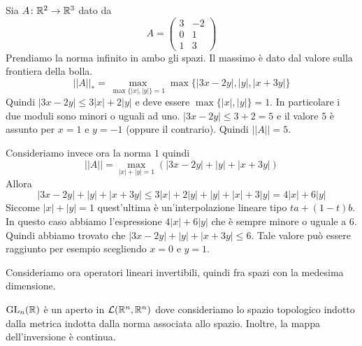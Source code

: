 \documentclass[a4paper]{article}
\begin{document}
\begin{snippetexercise}{}
    Sia \(A \colon \mathbb{R}^2 \to \mathbb{R}^3\)
    dato da
    \[
        A = \begin{pmatrix}
            3 & -2 \\ 0 & 1 \\ 1 & 3
        \end{pmatrix}
    \]
    Prendiamo la norma infinito in ambo gli spazi.
    Il massimo è dato dal valore sulla frontiera della bolla.
    \[
        ||A||_*
        = \max_{\max \{|x|, |y|\} = 1}
        \max \{|3x-2y|, |y|, |x+3y|\}
    \]
    Quindi \(|3x - 2y| \leq 3|x| + 2|y|\)
    e deve essere \(\max\{|x|,|y|\} = 1\).
    In particolare i due moduli sono minori o uguali ad uno.
    \(|3x-2y| \leq 3+2 = 5\) e il valore \(5\)
    è assunto per \(x=1\) e \(y=-1\) (oppure il contrario).
    Quindi \(||A||=5\).

    Consideriamo invece ora la norma \(1\)
    quindi
    \[
        ||A|| = \max_{|x| + |y| = 1}
        (|3x-2y| + |y| + |x+3y|)
    \]
    Allora
    \[
        |3x - 2y| + |y| + |x + 3y|
        \leq 3|x| + 2|y| + |y| + |x| + 3|y|
        = 4|x| + 6|y|
    \]
    Siccome \(|x| + |y| = 1\)
    quest'ultima è un'interpolazione lineare
    tipo \(ta + (1-t)b\).
    In questo caso abbiamo l'espressione 
    \(4|x| + 6|y|\)
    che è sempre minore o uguale a \(6\).
    Quindi abbiamo trovato che \(|3x-2y| + |y| + |x + 3y| \leq 6\).
    Tale valore può essere raggiunto per esempio scegliendo \(x=0\) e \(y=1\).
\end{snippetexercise}

Consideriamo ora operatori lineari invertibili,
quindi fra spazi con la medesima dimensione.

\begin{snippettheorem}{}
    \(\text{GL}_n(\mathbb{R})\) è un aperto 
    in \(\mathcal{L}(\mathbb{R}^n, \mathbb{R}^n)\)
    dove consideriamo lo spazio topologico indotto dalla metrica indotta
    dalla norma associata allo spazio. Inoltre, la mappa dell'inversione è continua.
\end{snippettheorem}
\end{document}
